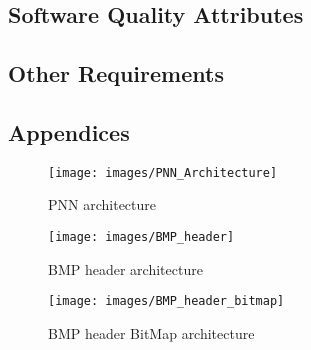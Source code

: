 \documentclass[12pt]{article}
\begin{document}
\subsection{Software Quality Attributes}
\subsection{Other Requirements}
\subsection{Appendices}
\label{sec:appendices}
\begin{figure}[h]\centering
  \texttt{[image: images/PNN\_Architecture]}
  \caption{PNN architecture}
  \label{pnn_architecture}
\end{figure}
\begin{figure}[h]\centering
  \texttt{[image: images/BMP\_header]}
  \caption{BMP header architecture}
  \label{bmp_header}
\end{figure}
\begin{figure}[h]\centering
  \texttt{[image: images/BMP\_header\_bitmap]}
  \caption{BMP header BitMap architecture}
  \label{bmp_header_bitmap}
\end{figure}
\end{document}
